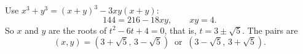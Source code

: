 Use $x^3+y^3=(x+y)^3-3xy(x+y)$:
\[
144=216-18xy,\qquad xy=4 .
\]
So $x$ and $y$ are the roots of $t^2-6t+4=0$, that is, $t=3\pm\sqrt5$. The pairs are
\[
\boxed{(x,y)=(3+\sqrt5,\,3-\sqrt5)\ \text{ or }\ (3-\sqrt5,\,3+\sqrt5)}.
\]
